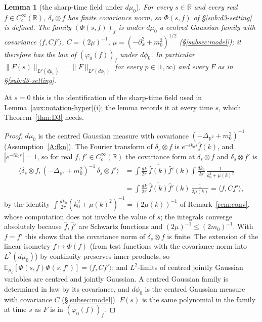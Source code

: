 \documentclass[11pt,a4paper]{article}
\theoremstyle{plain}
\theoremstyle{definition}
\theoremstyle{plain}
\newtheorem{auxlemma}{Lemma}
\theoremstyle{definition}
\newcommand{\R}{\mathbb{R}}
\newcommand{\E}{\mathbb{E}}
\newcommand{\ip}[2]{\langle #1,#2\rangle}
\newcommand{\dmu}{d\mu_0}
\newcommand{\dphi}{d\phi_0}
\begin{document}
\begin{auxlemma}[the sharp-time field under $\dmu$]\label{aux:d3-sharp}
For every $s\in\R$ and every real $f\in C_c^\infty(\R)$, $\delta_s\otimes f$ has finite
covariance norm, so $\Phi(s,f)$ of \S\ref{sub:d3-setting} is defined.  The family
$(\Phi(s,f))_f$ is under $\dmu$ a centred Gaussian family with covariance $\ip{f}{Cf'}$,
$C=(2\mu)^{-1}$, $\mu=(-\partial_x^2+m_0^2)^{1/2}$ (\S\ref{subsec:model}); it therefore has the law
of $(\varphi_0(f))_f$ under $\dphi$.  In particular $\|F(s)\|_{L^p(\dmu)}=\|F\|_{L^p(\dphi)}$ for
every $p\in[1,\infty)$ and every $F$ as in \S\ref{sub:d3-setting}.
\end{auxlemma}

At $s=0$ this is the identification of the sharp-time field used in
Lemma~\ref{aux:notation-hyper}(i); the lemma records it at every time $s$, which
Theorem~\ref{thm:D3} needs.

\begin{proof}
$\dmu$ is the centred Gaussian measure with covariance $(-\Delta_{\R^2}+m_0^2)^{-1}$
(Assumption~\ref{A:fkn}).  The Fourier transform of $\delta_s\otimes f$ is
$e^{-ik_0s}\hat f(k)$, and $|e^{-ik_0s}|=1$, so for real $f,f'\in C_c^\infty(\R)$ the covariance
form at $\delta_s\otimes f$ and $\delta_s\otimes f'$ is
\begin{align*}
 \ip{\delta_s\otimes f}{(-\Delta_{\R^2}+m_0^2)^{-1}\,\delta_s\otimes f'}
 &=\int\frac{dk}{2\pi}\,\overline{\hat f(k)}\hat f'(k)\int\frac{dk_0}{2\pi}\,
 \frac1{k_0^2+\mu(k)^2}\\
 &=\int\frac{dk}{2\pi}\,\overline{\hat f(k)}\hat f'(k)\,\frac1{2\mu(k)}=\ip{f}{Cf'} ,
\end{align*}
by the identity $\int\frac{dk_0}{2\pi}(k_0^2+\mu(k)^2)^{-1}=(2\mu(k))^{-1}$ of Remark~\ref{rem:conv}, whose computation does not involve the value of $s$; the integrals converge
absolutely because $\hat f,\hat f'$ are Schwartz functions and $(2\mu)^{-1}\le(2m_0)^{-1}$.  With
$f=f'$ this shows that the covariance norm of $\delta_s\otimes f$ is finite.  The extension of the
linear isometry $f\mapsto\Phi(f)$ (from test functions with the covariance norm into $L^2(\dmu)$)
by continuity preserves inner products, so $\E_{\mu_0}[\Phi(s,f)\Phi(s,f')]=\ip f{Cf'}$; and
$L^2$-limits of centred jointly Gaussian variables are centred and jointly Gaussian.  A centred
Gaussian family is determined in law by its covariance, and $\dphi$ is the centred Gaussian measure
with covariance $C$ (\S\ref{subsec:model}).  $F(s)$ is the same polynomial in the family at time $s$
as $F$ is in $(\varphi_0(f))_f$.
\end{proof}
\end{document}
